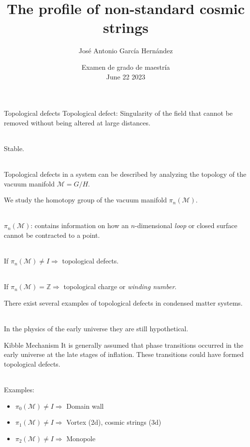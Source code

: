 \documentclass[14pt]{beamer}
\institute{Instituto de Ciencias Nucleares, UNAM}
\author{José Antonio García Hernández}
\title{The profile of non-standard cosmic strings}
\date{Examen de grado de maestría \\ June 22 2023}
\begin{document}
\begin{frame}
\titlepage
\end{frame}

\begin{frame}{Topological defects}
Topological defect: Singularity of the field that cannot be removed without being altered at large distances. \\~\

Stable.\\~\


Topological defects in a system can be described by analyzing the topology of the vacuum manifold $\mathcal{M}=G/H$.


\end{frame}

\begin{frame}
We study the homotopy group of the vacuum manifold $\pi_n(\mathcal{M})$.\\~\

$\pi_n(\mathcal{M})$: contains information on how an $n$-dimensional \textit{loop} or closed surface cannot be contracted to a point. \\~\


If $\pi_n(\mathcal{M}) \neq I \Rightarrow $ topological defects. \\~\

If $\pi_n(\mathcal{M}) = \mathbb{Z} \Rightarrow $ topological charge or \textit{winding number}.
\end{frame}


\begin{frame}
	There exist several examples of topological defects in condensed matter systems.\\~\
	
	In the physics of the early universe they are still hypothetical.
\end{frame}


\begin{frame}{Kibble Mechanism}
It is generally assumed that phase transitions occurred in the early universe at the late stages of inflation. These transitions could have formed topological defects. \\~\

Examples:\\
\begin{itemize}
	\item $\pi_0(\mathcal{M}) \neq I \Rightarrow$ Domain wall 
	\item $\pi_1(\mathcal{M}) \neq I\Rightarrow$ Vortex (2d), cosmic strings (3d) 
	\item $\pi_2(\mathcal{M}) \neq I\Rightarrow$ Monopole

\end{itemize}

\end{frame}
\end{document}
